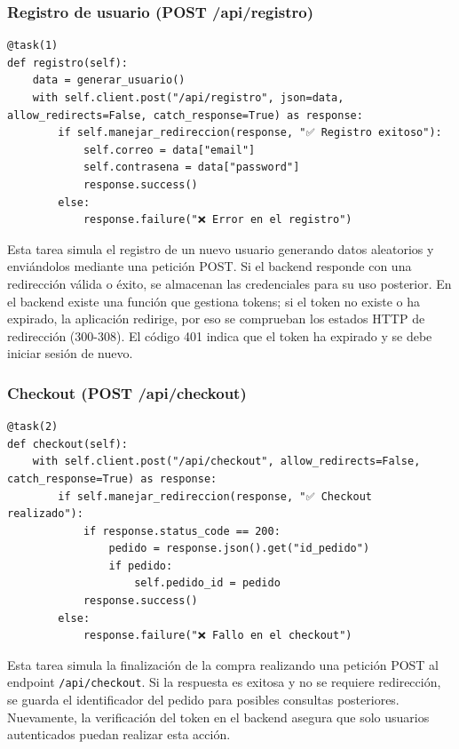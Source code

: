 \documentclass[10pt]{book}
\begin{document}
\subsubsection{Registro de usuario (POST /api/registro)}

\begin{lstlisting}[style=pythonclean, caption={Tarea para registrar un nuevo usuario}]
@task(1)
def registro(self):
    data = generar_usuario()
    with self.client.post("/api/registro", json=data, allow_redirects=False, catch_response=True) as response:
        if self.manejar_redireccion(response, "✅ Registro exitoso"):
            self.correo = data["email"]
            self.contrasena = data["password"]
            response.success()
        else:
            response.failure("❌ Error en el registro")
\end{lstlisting}

Esta tarea simula el registro de un nuevo usuario generando datos aleatorios y enviándolos mediante una petición POST. Si el backend responde con una redirección válida o éxito, se almacenan las credenciales para su uso posterior. En el backend existe una función que gestiona tokens; si el token no existe o ha expirado, la aplicación redirige, por eso se comprueban los estados HTTP de redirección (300-308). El código 401 indica que el token ha expirado y se debe iniciar sesión de nuevo.

\subsubsection{Checkout (POST /api/checkout)}

\begin{lstlisting}[style=pythonclean, caption={Tarea para realizar el checkout}]
@task(2)
def checkout(self):
    with self.client.post("/api/checkout", allow_redirects=False, catch_response=True) as response:
        if self.manejar_redireccion(response, "✅ Checkout realizado"):
            if response.status_code == 200:
                pedido = response.json().get("id_pedido")
                if pedido:
                    self.pedido_id = pedido
            response.success()
        else:
            response.failure("❌ Fallo en el checkout")
\end{lstlisting}

Esta tarea simula la finalización de la compra realizando una petición POST al endpoint \texttt{/api/checkout}. Si la respuesta es exitosa y no se requiere redirección, se guarda el identificador del pedido para posibles consultas posteriores. Nuevamente, la verificación del token en el backend asegura que solo usuarios autenticados puedan realizar esta acción.
\end{document}
